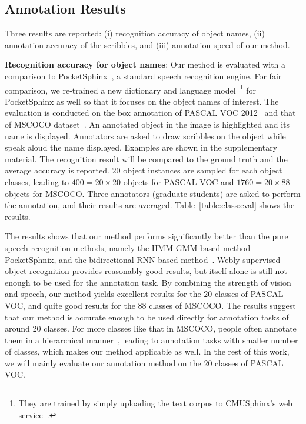 \documentclass[runningheads]{llncs}
\begin{document}


\subsection{Annotation Results}
Three results are reported: (i) recognition accuracy of object names, (ii) annotation accuracy of the scribbles, and (iii) annotation speed of our method.   

\textbf{Recognition accuracy for object names}: 
Our method is evaluated with a comparison to PocketSphinx~\citep{sphinx}, a standard speech recognition engine. For fair comparison, we re-trained a new dictionary and language model~\footnote{They are trained by simply uploading the text corpus to CMUSphinx's web service~\citep{sphinx:webtrain}.}  for PocketSphinx as well so that it focuses on the object names of
interest. 
The evaluation is conducted on the box annotation of PASCAL VOC 2012~\citep{pascal:2011} and that of MSCOCO dataset~\citep{coco:eccv}.  An annotated object in the image is highlighted and its name is displayed. Annotators are asked to draw scribbles on the object while speak aloud the name displayed.   Examples are shown in the supplementary material. 
The recognition result will be compared to the ground truth and the average accuracy is reported. $20$ object instances are sampled for each object classes, leading to $400=20\times 20$ objects for PASCAL VOC and $1760=20\times 88$ objects for MSCOCO. Three annotators (graduate students) are asked to perform the annotation, and their results are averaged. Table~\ref{table:class:eval} shows the results. 

The results shows that our method  performs significantly better than the pure speech recognition methods, namely the HMM-GMM based method PocketSphnix, and the bidirectional RNN based method~\citep{end-to-end:speech,lexfree2015}. Webly-supervised object recognition provides reasonably good results, but itself alone is still not enough to be used for the annotation task. By combining  the strength of vision and speech, our method yields excellent results for the $20$ classes of PASCAL VOC, and quite good results for the $88$ classes of MSCOCO. The results suggest that our method is accurate enough to be used directly for annotation tasks of around $20$ classes. For more classes like that in MSCOCO, people often annotate them in a hierarchical manner~\citep{coco:eccv}, leading to annotation tasks with smaller number of classes, which makes our method applicable as well.  In the rest of this work, we will mainly evaluate our annotation method on the $20$ classes of PASCAL VOC.  
\end{document}
